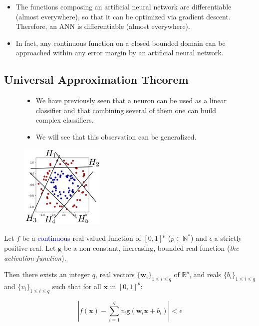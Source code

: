 \documentclass{book}
\newcommand{\x}{\mathbf{x}}
\newcommand{\act}{\texttt{g}}%
\newcommand{\R}{\mathbb{R}}
\newcommand{\N}{\mathbb{N}}
\begin{document}
\begin{itemize}
\item The functions composing an artificial neural network are differentiable (almost everywhere), so that it can be optimized via gradient descent. Therefore, an ANN is differentiable (almost everywhere).
\item In fact, any continuous function on a closed bounded domain can be approached within any error margin by an artificial neural network.
\end{itemize}

\subsection{Universal Approximation Theorem}

\begin{figure}[h]
    \centering
    \begin{minipage}{.5\textwidth}
        \begin{itemize}
        \item We have previously seen that a neuron can be used as a linear classifier and that combining several of them one can build complex classifiers.
        \item We will see that this observation can be generalized.
        \end{itemize}
    \end{minipage}%
    \begin{minipage}{.5\textwidth}
        \centering
        \includegraphics[height=4cm]{circles_H}
    \end{minipage}
\end{figure}

\begin{myblock}{}
Let $f$ be a \textcolor{blue}{continuous} real-valued function of $[0,1]^p$ ($p \in \N^*$) and $\epsilon$ a strictly positive real. Let $\act$ be a non-constant, increasing, bounded real function (\emph{\small{the activation function}}).

Then there exists an integer $q$, real vectors $\{\mathbf{w}_i\}_{1 \leq i \leq q}$ of $\R^p$, and reals $\{b_i\}_{1 \leq i \leq q}$ and $\{v_i\}_{1 \leq i \leq q}$ such that for all $\x$ in $[0,1]^p$:

\[
\left| f(\x) - \sum\limits_{i=1}^q v_i \act(\mathbf{w}_i\x + b_i) \right| < \epsilon
\]
\end{myblock}
\end{document}
